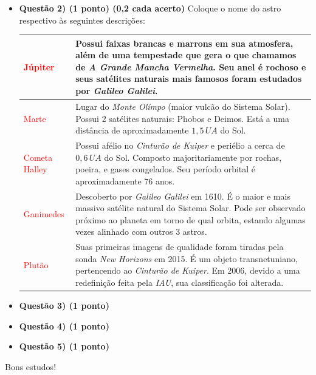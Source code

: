 \documentclass[a4paper, 12pt]{article}
\newcommand{\red}[1]{\textcolor{red}{#1}}
\begin{document}
\begin{flushleft}
\begin{itemize}
		\item \textbf{Questão 2) (1 ponto) (0,2 cada acerto)} Coloque o nome do astro respectivo às seguintes descrições:
			\begin{center} \begin{tabular}{|M{0.2\textwidth}|M{0.65\textwidth}|}
				\hline
				\red{Júpiter} & Possui faixas brancas e marrons em sua atmosfera, além de uma tempestade que gera o que chamamos de \textit{A Grande Mancha Vermelha}. Seu anel é rochoso e seus satélites naturais mais famosos foram estudados por \textit{Galileo Galilei}. \\ \hline
				\red{Marte} & Lugar do \textit{Monte Olímpo} (maior vulcão do Sistema Solar). Possui 2 satélites naturais: Phobos e Deimos. Está a uma distância de aproximadamente $1,5 \, UA$ do Sol. \\ \hline
				\red{Cometa Halley} & Possui afélio no \textit{Cinturão de Kuiper} e periélio a cerca de $0,6 \, UA$ do Sol. Composto majoritariamente por rochas, poeira, e gases congelados. Seu período orbital é aproximadamente $76$ anos. \\ \hline
				\red{Ganimedes} & Descoberto por \textit{Galileo Galilei} em 1610. É o maior e mais massivo satélite natural do Sistema Solar. Pode ser observado próximo ao planeta em torno de qual orbita, estando algumas vezes alinhado com outros 3 astros.  \\ \hline
				\red{Plutão} & Suas primeiras imagens de qualidade foram tiradas pela sonda \textit{New Horizons} em 2015. É um objeto transnetuniano, pertencendo ao \textit{Cinturão de Kuiper}. Em 2006, devido a uma redefinição feita pela \textit{IAU}, sua classificação foi alterada. \\ \hline
			\end{tabular} \end{center}
		
		\item \textbf{Questão 3) (1 ponto)} 
			
		\item \textbf{Questão 4) (1 ponto)} 
				
		\item \textbf{Questão 5) (1 ponto)} 
			
	\end{itemize}
	\end{flushleft}
	\begin{flushright}
		\begin{large}
			Bons estudos!
		\end{large}
	\end{flushright}
\end{document}
